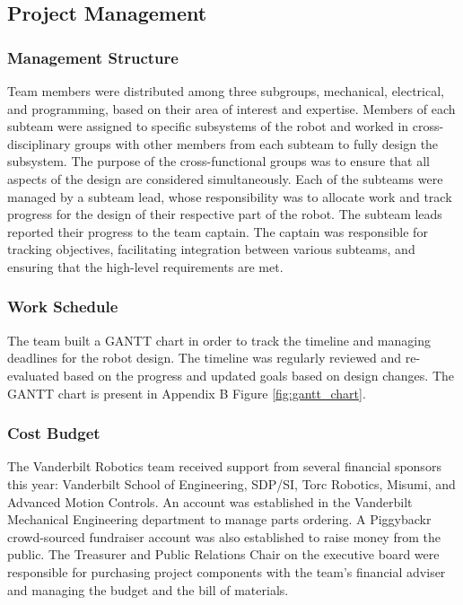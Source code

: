 \documentclass[class=article, crop=false]{standalone}
\begin{document}
	\subsection{Project Management}
	\label{subsec:project_management}
	
	\subsubsection{Management Structure}
	Team members were distributed among three subgroups, mechanical, electrical, and programming, based on their area of interest and expertise. Members of each subteam were assigned to specific subsystems of the robot and worked in cross-disciplinary groups with other members from each subteam to fully design the subsystem. The purpose of the cross-functional groups was to ensure that all aspects of the design are considered simultaneously. Each of the subteams were managed by a subteam lead, whose responsibility was to allocate work and track progress for the design of their respective part of the robot. The subteam leads reported their progress to the team captain. The captain was responsible for tracking objectives, facilitating integration between various subteams, and ensuring that the high-level requirements are met.
	
	\subsubsection{Work Schedule}
	The team built a GANTT chart in order to track the timeline and managing deadlines for the robot design. The timeline was regularly reviewed and re-evaluated based on the progress and updated goals based on design changes. The GANTT chart is present in Appendix B Figure \ref{fig:gantt_chart}.
	
	\subsubsection{Cost Budget}
	
	The Vanderbilt Robotics team received support from several financial sponsors this year: Vanderbilt School of Engineering, SDP/SI, Torc Robotics, Misumi, and Advanced Motion Controls. An account was established in the Vanderbilt Mechanical Engineering department to manage parts ordering. A Piggybackr crowd-sourced fundraiser account was also established to raise money from the public. The Treasurer and Public Relations Chair on the executive board were responsible for purchasing project components with the team’s financial adviser and managing the budget and the bill of materials. 
	
\end{document}
